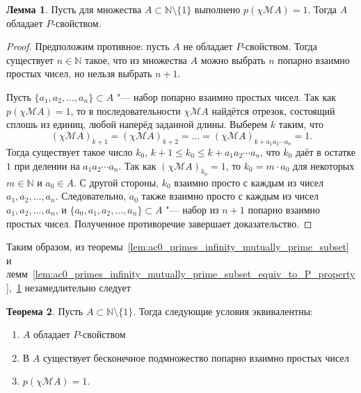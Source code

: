 \documentclass[a4paper,openbib]{article}
\theoremstyle{definition}
\newtheorem{lemma}{Лемма}[section]
\newtheorem{theorem}[lemma]{Теорема}
\begin{document}

\begin{lemma}
	\label{lem:ac0_primes_q_psi_A_0_causes_P}
	Пусть для множества $A\subset\mathbb{N}\setminus\{1\}$ выполнено $p(\chi\mathscr{M}A)=1$.
	Тогда $A$ обладает $P$-свойством.
\end{lemma}

\begin{proof}
	Предположим противное: пусть $A$ не обладает $P$-свойством.
	Тогда существует $n\in\mathbb{N}$ такое, что из множества $A$ можно выбрать $n$
	попарно взаимно простых чисел, но нельзя выбрать $n+1$.

	Пусть $\{a_1, a_2, ..., a_n\}\subset A$ "--- набор попарно взаимно простых чисел.
	Так как $p(\chi\mathscr{M}A)=1$, то в последовательности $\chi\mathscr{M}A$ найдётся отрезок, состоящий сплошь из единиц,
	любой наперёд заданной длины.
	Выберем $k$ таким, что
	\begin{equation}
		(\chi\mathscr{M}A)_{k+1} = (\chi\mathscr{M}A)_{k+2} = ... = (\chi\mathscr{M}A)_{k+a_1a_2\cdots a_n} = 1
		.
	\end{equation}
	Тогда существует такое число $k_0$, $k+1 \leq k_0 \leq k+a_1a_2\cdots a_n$,
	что $k_0$ даёт в остатке $1$ при делении на $a_1a_2\cdots a_n$.
	Так как $(\chi\mathscr{M}A)_{k_0} = 1$, то $k_0 = m\cdot a_0$ для некоторых $m\in\mathbb{N}$ и $a_0\in A$.
	С другой стороны, $k_0$ взаимно просто с каждым из чисел $a_1, a_2, ..., a_n$.
	Следовательно, $a_0$ также взаимно просто с каждым из чисел $a_1, a_2, ..., a_n$,
	и $\{a_0, a_1, a_2, ..., a_n\}\subset A$ "--- набор из $n+1$ попарно взаимно простых чисел.
	Полученное противоречие завершает доказательство.
\end{proof}

Таким образом,
из теоремы~\ref{lem:ac0_primes_infinity_mutually_prime_subset}
и лемм~\ref{lem:ac0_primes_infinity_mutually_prime_subset_equiv_to_P_property},~\ref{lem:ac0_primes_q_psi_A_0_causes_P}
незамедлительно следует
\begin{theorem}
	Пусть $A\subset \mathbb{N}\setminus\{1\}$.
	Тогда следующие условия эквивалентны:
	\begin{enumerate}[label=(\roman*)]
		\item
			$A$ обладает $P$-свойством
		\item
			В $A$ существует бесконечное подмножество попарно взаимно простых чисел
		\item
			$p(\chi\mathscr{M}A)=1$.
	\end{enumerate}
\end{theorem}
\end{document}
